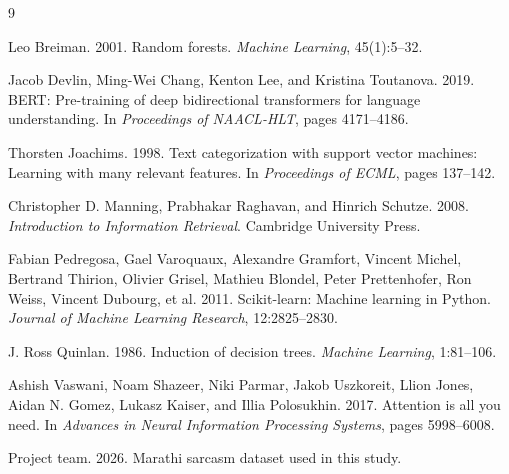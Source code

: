 \documentclass[11pt]{article}
\begin{document}

\begin{thebibliography}{9}

Leo Breiman. 2001.
\newblock Random forests.
\newblock \emph{Machine Learning}, 45(1):5--32.

Jacob Devlin, Ming-Wei Chang, Kenton Lee, and Kristina Toutanova. 2019.
\newblock BERT: Pre-training of deep bidirectional transformers for language understanding.
\newblock In \emph{Proceedings of NAACL-HLT}, pages 4171--4186.

Thorsten Joachims. 1998.
\newblock Text categorization with support vector machines: Learning with many relevant features.
\newblock In \emph{Proceedings of ECML}, pages 137--142.

Christopher D. Manning, Prabhakar Raghavan, and Hinrich Schutze. 2008.
\newblock \emph{Introduction to Information Retrieval}.
\newblock Cambridge University Press.

Fabian Pedregosa, Gael Varoquaux, Alexandre Gramfort, Vincent Michel, Bertrand Thirion, Olivier Grisel, Mathieu Blondel, Peter Prettenhofer, Ron Weiss, Vincent Dubourg, et al. 2011.
\newblock Scikit-learn: Machine learning in Python.
\newblock \emph{Journal of Machine Learning Research}, 12:2825--2830.

J. Ross Quinlan. 1986.
\newblock Induction of decision trees.
\newblock \emph{Machine Learning}, 1:81--106.

Ashish Vaswani, Noam Shazeer, Niki Parmar, Jakob Uszkoreit, Llion Jones, Aidan N. Gomez, Lukasz Kaiser, and Illia Polosukhin. 2017.
\newblock Attention is all you need.
\newblock In \emph{Advances in Neural Information Processing Systems}, pages 5998--6008.

Project team. 2026.
\newblock Marathi sarcasm dataset used in this study.

\end{thebibliography}
\end{document}
